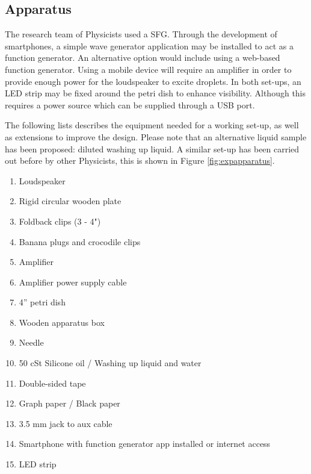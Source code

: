\subsection{Apparatus}

The research team of Physicists used a SFG. Through the development of smartphones, a simple wave generator application may be installed to act as a function generator. An alternative option would include using a web-based function generator. Using a mobile device will require an amplifier in order to provide enough power for the loudspeaker to excite droplets. In both set-ups, an LED strip may be fixed around the petri dish to enhance visibility. Although this requires a power source which can be supplied through a USB port. 

The following lists describes the equipment needed for a working set-up, as well as extensions to improve the design. Please note that an alternative liquid sample has been proposed: diluted washing up liquid. A similar set-up has been carried out before by other Physicists, this is shown in Figure \ref {fig:expapparatus}.

\begin{enumerate}
\item  Loudspeaker

\item  Rigid circular wooden plate

\item  Foldback clips (3 - 4")

\item  Banana plugs and crocodile clips

\item  Amplifier

\item  Amplifier power supply cable

\item  4'' petri dish

\item  Wooden apparatus box

\item  Needle

\item  50 cSt Silicone oil / Washing up liquid  and water

\item  Double-sided tape

\item  Graph paper / Black paper

\item  3.5 mm jack to aux cable

\item  Smartphone with function generator app installed or internet access

\item  LED strip

\end{enumerate}

